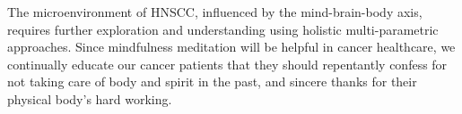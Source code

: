 \documentclass[jpm,article,submit,moreauthors,pdftex]{Definitions/mdpi}
\begin{document}
\begin{paracol}{2}
The microenvironment of HNSCC, influenced by the mind-brain-body axis, requires further exploration and understanding using holistic multi-parametric approaches.
Since mindfulness meditation will be helpful in cancer healthcare, we continually educate our cancer patients that they should repentantly confess for not taking care of body and spirit in the past, and sincere thanks for their physical body's hard working.




\vspace{6pt} 




\end{paracol}
\end{document}
